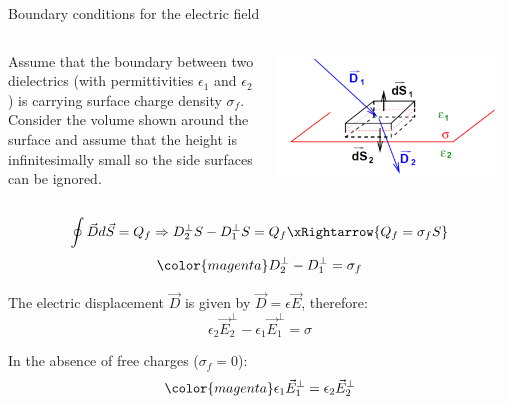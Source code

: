 \begin{frame}{Boundary conditions for the electric field}

\begin{columns}
  \begin{column}{0.50\textwidth}
   {\small
     Assume that the boundary between two dielectrics (with
     permittivities $\epsilon_1$ and  $\epsilon_2$)
     is carrying surface charge density $\sigma_f$.\\
     Consider the volume shown around the surface and
     assume that the height is infinitesimally small so the side
     surfaces can be ignored.
  }
  \end{column}
  \begin{column}{0.50\textwidth}
    \begin{center}
      \includegraphics[width=0.95\textwidth]{./images/schematics/boundary_conditions_electric_field_1.png}\\
    \end{center}
  \end{column}
\end{columns}

\begin{equation*}
  \oint \vec{D} d\vec{S} = Q_f \Rightarrow
       D_2^{\perp} S - D_1^{\perp} S = Q_f \xRightarrow{Q_f = \sigma_f S}
\end{equation*}
\begin{equation*}
         {\color{magenta}D_2^{\perp} - D_1^{\perp} = \sigma_f}
\end{equation*}

The electric displacement $\vec{D}$ is given by
$\displaystyle \vec{D} = \epsilon \vec{E}$,
therefore:
\begin{equation*}
   \epsilon_2 \vec{E}_2^{\perp} - \epsilon_1 \vec{E}_1^{\perp} = \sigma
\end{equation*}

In the absence of free charges ($\sigma_f=0$):
\begin{equation*}
   {\color{magenta} \epsilon_1 \vec{E}_1^{\perp} = \epsilon_2 \vec{E}_2^{\perp} }
\end{equation*}

\end{frame}


